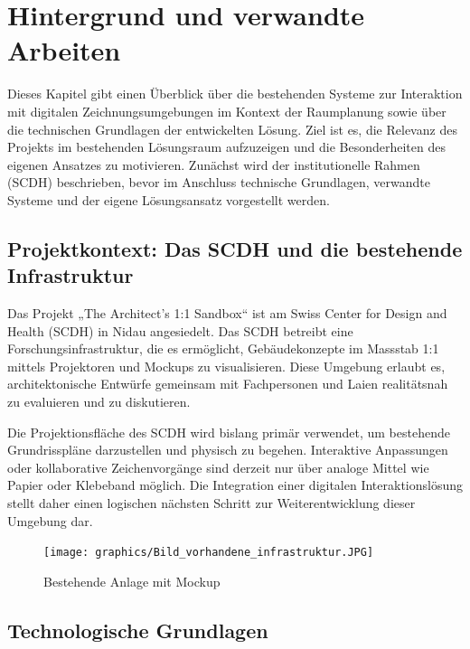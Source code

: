\section{Hintergrund und verwandte Arbeiten}
\label{sec:Hintergrund und verwandte Arbeiten}

Dieses Kapitel gibt einen Überblick über die bestehenden Systeme zur Interaktion mit digitalen Zeichnungsumgebungen im Kontext der Raumplanung sowie über die technischen Grundlagen der entwickelten Lösung. Ziel ist es, die Relevanz des Projekts im bestehenden Lösungsraum aufzuzeigen und die Besonderheiten des eigenen Ansatzes zu motivieren. Zunächst wird der institutionelle Rahmen (SCDH) beschrieben, bevor im Anschluss technische Grundlagen, verwandte Systeme und der eigene Lösungsansatz vorgestellt werden.



\subsection{Projektkontext: Das SCDH und die bestehende Infrastruktur}

Das Projekt „The Architect's 1:1 Sandbox“ ist am Swiss Center for Design and Health (SCDH) in Nidau angesiedelt. Das SCDH betreibt eine Forschungsinfrastruktur, die es ermöglicht, Gebäudekonzepte im Massstab 1:1 mittels Projektoren und Mockups zu visualisieren. Diese Umgebung erlaubt es, architektonische Entwürfe gemeinsam mit Fachpersonen und Laien realitätsnah zu evaluieren und zu diskutieren.

Die Projektionsfläche des SCDH wird bislang primär verwendet, um bestehende Grundrisspläne darzustellen und physisch zu begehen. Interaktive Anpassungen oder kollaborative Zeichenvorgänge sind derzeit nur über analoge Mittel wie Papier oder Klebeband möglich. Die Integration einer digitalen Interaktionslösung stellt daher einen logischen nächsten Schritt zur Weiterentwicklung dieser Umgebung dar.

\begin{figure}[H]
    \centering
    \texttt{[image: graphics/Bild\_vorhandene\_infrastruktur.JPG]}
    \caption{Bestehende Anlage mit Mockup}
    \label{fig:placeholder}
\end{figure}

\clearpage

\subsection{Technologische Grundlagen}

